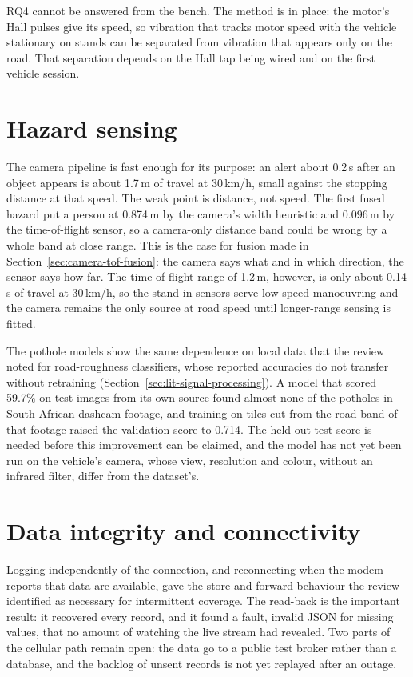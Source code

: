 RQ4 cannot be answered from the bench. The method is in place: the motor's Hall pulses give its speed, so vibration that tracks motor speed with the vehicle stationary on stands can be separated from vibration that appears only on the road. That separation depends on the Hall tap being wired and on the first vehicle session.

\section{Hazard sensing}

The camera pipeline is fast enough for its purpose: an alert about 0.2\,s after an object appears is about 1.7\,m of travel at 30\,km/h, small against the stopping distance at that speed. The weak point is distance, not speed. The first fused hazard put a person at 0.874\,m by the camera's width heuristic and 0.096\,m by the time-of-flight sensor, so a camera-only distance band could be wrong by a whole band at close range. This is the case for fusion made in Section~\ref{sec:camera-tof-fusion}: the camera says what and in which direction, the sensor says how far. The time-of-flight range of 1.2\,m, however, is only about 0.14\,s of travel at 30\,km/h, so the stand-in sensors serve low-speed manoeuvring and the camera remains the only source at road speed until longer-range sensing is fitted.

The pothole models show the same dependence on local data that the review noted for road-roughness classifiers, whose reported accuracies do not transfer without retraining (Section~\ref{sec:lit-signal-processing}). A model that scored 59.7\% on test images from its own source found almost none of the potholes in South African dashcam footage, and training on tiles cut from the road band of that footage raised the validation score to 0.714. The held-out test score is needed before this improvement can be claimed, and the model has not yet been run on the vehicle's camera, whose view, resolution and colour, without an infrared filter, differ from the dataset's.

\section{Data integrity and connectivity}

Logging independently of the connection, and reconnecting when the modem reports that data are available, gave the store-and-forward behaviour the review identified as necessary for intermittent coverage. The read-back is the important result: it recovered every record, and it found a fault, invalid JSON for missing values, that no amount of watching the live stream had revealed. Two parts of the cellular path remain open: the data go to a public test broker rather than a database, and the backlog of unsent records is not yet replayed after an outage.

